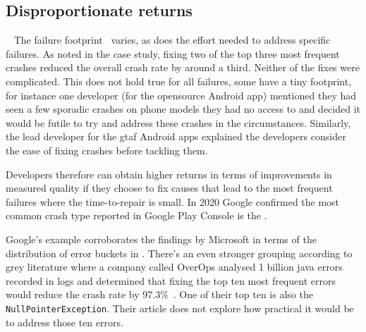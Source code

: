 

\subsection{Disproportionate returns}~\label{discussion-disproportionate-returns-topic}
The failure footprint~ varies, as does the effort needed to address specific failures. As noted in the  case study, fixing two of the top three most frequent crashes reduced the overall crash rate by around a third. Neither of the fixes were complicated. This does not hold true for all failures, some have a tiny footprint, for instance one developer (for the opensource  Android app)
mentioned they had seen a few sporadic crashes on phone models they had no access to and decided it would be futile to try and address these crashes in the circumstances. Similarly, the lead developer for the \Gls{gtaf} Android apps explained the developers consider the ease of fixing crashes before tackling them. 

Developers therefore can obtain higher returns in terms of improvements in measured quality if they choose to fix causes that lead to the most frequent failures where the time-to-repair is small. In 2020 Google confirmed the most common crash type reported in Google Play Console is the  .  %

Google's example corroborates the findings by Microsoft in terms of the distribution of error buckets in . There's an even stronger grouping according to grey literature where a company called OverOps analysed 1 billion java errors recorded in logs and determined that fixing the top ten most frequent errors would reduce the crash rate by 97.3\%~. One of their top ten is also the \texttt{NullPointerException}. Their article does not explore how practical it would be to address those ten errors. 

